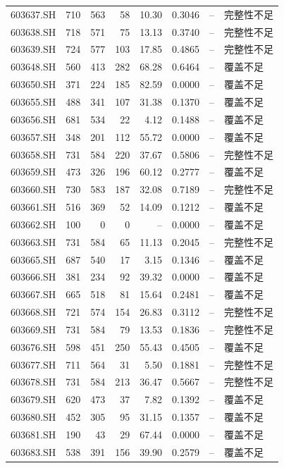 \documentclass[10pt,a4paper]{article}
\begin{document}
\begin{longtable}{lrrr r r r l}
603637.SH & 710 & 563 & 58 & 10.30 & 0.3046 & -- & 完整性不足\\
603638.SH & 718 & 571 & 75 & 13.13 & 0.3740 & -- & 完整性不足\\
603639.SH & 724 & 577 & 103 & 17.85 & 0.4865 & -- & 完整性不足\\
603648.SH & 560 & 413 & 282 & 68.28 & 0.6464 & -- & 覆盖不足\\
603650.SH & 371 & 224 & 185 & 82.59 & 0.0000 & -- & 覆盖不足\\
603655.SH & 488 & 341 & 107 & 31.38 & 0.1370 & -- & 覆盖不足\\
603656.SH & 681 & 534 & 22 & 4.12 & 0.1488 & -- & 覆盖不足\\
603657.SH & 348 & 201 & 112 & 55.72 & 0.0000 & -- & 覆盖不足\\
603658.SH & 731 & 584 & 220 & 37.67 & 0.5806 & -- & 完整性不足\\
603659.SH & 473 & 326 & 196 & 60.12 & 0.2777 & -- & 覆盖不足\\
603660.SH & 730 & 583 & 187 & 32.08 & 0.7189 & -- & 完整性不足\\
603661.SH & 516 & 369 & 52 & 14.09 & 0.1212 & -- & 覆盖不足\\
603662.SH & 100 & 0 & 0 & -- & 0.0000 & -- & 覆盖不足\\
603663.SH & 731 & 584 & 65 & 11.13 & 0.2045 & -- & 完整性不足\\
603665.SH & 687 & 540 & 17 & 3.15 & 0.1346 & -- & 覆盖不足\\
603666.SH & 381 & 234 & 92 & 39.32 & 0.0000 & -- & 覆盖不足\\
603667.SH & 665 & 518 & 81 & 15.64 & 0.2481 & -- & 覆盖不足\\
603668.SH & 721 & 574 & 154 & 26.83 & 0.3112 & -- & 完整性不足\\
603669.SH & 731 & 584 & 79 & 13.53 & 0.1836 & -- & 完整性不足\\
603676.SH & 598 & 451 & 250 & 55.43 & 0.4505 & -- & 覆盖不足\\
603677.SH & 711 & 564 & 31 & 5.50 & 0.1881 & -- & 完整性不足\\
603678.SH & 731 & 584 & 213 & 36.47 & 0.5667 & -- & 完整性不足\\
603679.SH & 620 & 473 & 37 & 7.82 & 0.1392 & -- & 覆盖不足\\
603680.SH & 452 & 305 & 95 & 31.15 & 0.1357 & -- & 覆盖不足\\
603681.SH & 190 & 43 & 29 & 67.44 & 0.0000 & -- & 覆盖不足\\
603683.SH & 538 & 391 & 156 & 39.90 & 0.2579 & -- & 覆盖不足\\

\end{longtable}
\end{document}
